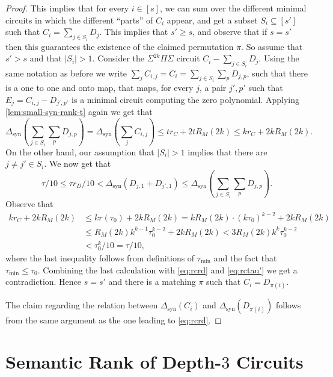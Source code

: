 \documentclass[12pt]{article}
\newcommand{\Sps}[1]{\Sigma^{#1} \Pi\Sigma}
\newcommand{\ranksyn}{\Delta_{\text{syn}}}
\begin{document}
\begin{proof}
		This implies that for every $i \in [s]$, we can sum over the different minimal circuits in which  the different ``parts'' of $C_i$ appear, and get  a subset $S_i \subseteq [s']$ such that
		$C_i = \sum_{j \in S_i} D_j$. This implies that $s' \ge s$, and observe that if $s=s'$ then this guarantees the existence of the claimed permutation $\pi$. So assume that $s'>s$ and that $|S_i|>1$. Consider the $\Sps{2k}$ circuit $C_i-\sum_{j \in S_i} D_j$. Using the same notation as before we write $\sum_j C_{i,j}=C_i=\sum_{j\in S_i}\sum_p D_{j,p}$, such that there is a one to one and onto map, that maps, for every $j$, a pair $j',p'$ such that $E_j=C_{i,j}-D_{j',p'}$ is a minimal circuit computing the zero polynomial. Applying \autoref{lem:small-syn-rank-t} again we get that  
		\begin{equation}\label{eq:rcrd}
			\ranksyn(\sum_{j\in S_i}\sum_p D_{j,p})=\ranksyn(\sum_j C_{i,j})\leq tr_C+2t R_M(2k) \leq kr_C+2k R_M(2k).
		\end{equation}
		On the other hand, our assumption that $|S_i|>1$ implies that there are $j\neq j'\in S_i$. 
		We now get that
		\begin{equation}\label{eq:rctau'}
			\tau/10 \leq \tau r_D/10< \ranksyn(D_{j,1}+D_{j',1})\leq 	\ranksyn(\sum_{j\in S_i}\sum_p D_{j,p}) .
		\end{equation}
		Observe that 
		\begin{align*}
			kr_C+2k R_M(2k)& \leq k r(\tau_0) +2k R_M(2k) = k  R_M(2k) \cdot  (k \tau_0)^{k-2} +2k R_M(2k) \nonumber\\
			&\leq R_M(2k) k^{k-1} \tau_0^{k-2} +2k R_M(2k) < 3R_M(2k)k^k \tau_0^{k-2} \nonumber\\
			& < \tau_0^k/10 =\tau/10, 
		\end{align*}
		where the last inequality follows from definitions of $\tau_\text{min}$ and the fact that $\tau_\text{min}\leq \tau_0$.
		Combining the last calculation with \eqref{eq:rcrd} and \eqref{eq:rctau'} we get a contradiction. Hence $s=s'$ and there is a matching $\pi$ such that $C_i=D_{\pi(i)}$.
		

		The claim regarding the relation between $\ranksyn(C_i)$ and $\ranksyn(D_{\pi(i)})$ follows from the same argument as the one leading to \eqref{eq:rcrd}.
	\end{proof}
	
	
	
	\section{Semantic Rank of Depth-$3$ Circuits}
	
\end{document}
